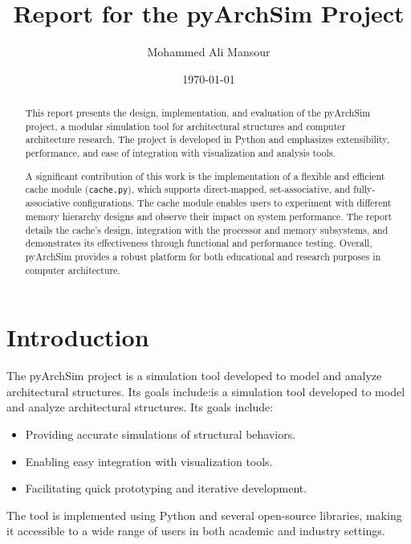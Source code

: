 \documentclass[12pt,a4paper]{report}
\title{Report for the pyArchSim Project}
\author{Mohammed Ali Mansour}
\date{\today}
\begin{document}
\maketitle
\tableofcontents
\newpage

\begin{abstract}
This report presents the design, implementation, and evaluation of the pyArchSim project, a modular simulation tool for architectural structures and computer architecture research. The project is developed in Python and emphasizes extensibility, performance, and ease of integration with visualization and analysis tools. 

A significant contribution of this work is the implementation of a flexible and efficient cache module (\texttt{cache.py}), which supports direct-mapped, set-associative, and fully-associative configurations. The cache module enables users to experiment with different memory hierarchy designs and observe their impact on system performance. The report details the cache's design, integration with the processor and memory subsystems, and demonstrates its effectiveness through functional and performance testing. Overall, pyArchSim provides a robust platform for both educational and research purposes in computer architecture.
\end{abstract}

\renewcommand{\thesection}{\arabic{section}}
\renewcommand{\thesubsection}{\thesection.\arabic{subsection}}

\section{Introduction}
The pyArchSim project \cite{pyarchsim_hawajkm} is a simulation tool developed to model and analyze architectural structures. Its goals include:is a simulation tool developed to model and analyze architectural structures. Its goals include:
\begin{itemize}
  \item Providing accurate simulations of structural behaviors.
  \item Enabling easy integration with visualization tools.
  \item Facilitating quick prototyping and iterative development.
\end{itemize}

The tool\cite{pyarchsim_hawajkm} is implemented using Python and several open-source libraries, making it accessible to a wide range of users in both academic and industry settings.
\end{document}

